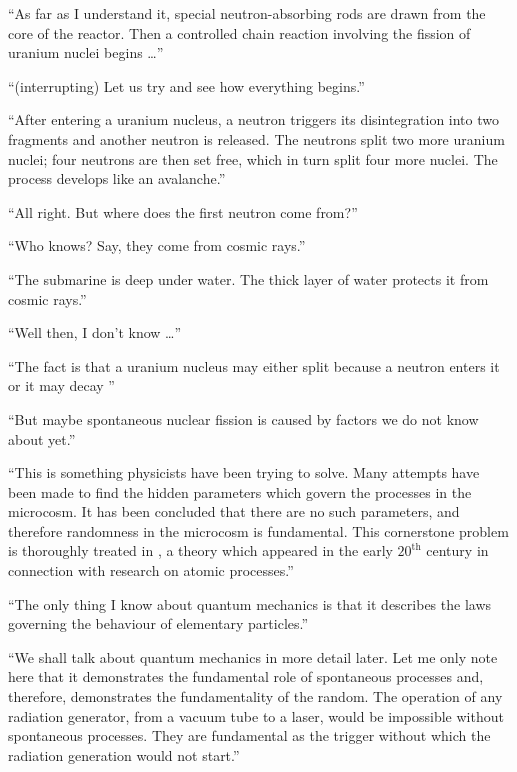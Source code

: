 \begin{dialogue}
\rdr  ``As far as I understand it, special
  neutron-absorbing rods are drawn from the core of the reactor. Then
  a controlled chain reaction involving the fission of uranium nuclei
  begins \ldots{}'' 

\athr ``(interrupting)  Let us try and see how everything begins.''

\rdr  ``After entering a uranium nucleus, a neutron triggers its
disintegration into two fragments and another neutron is released. The
neutrons split two more uranium nuclei; four neutrons are then set
free, which in turn split four more nuclei. The process develops like an avalanche.''

\athr  ``All right. But where does the first neutron come from?''

\rdr  ``Who knows? Say, they come from cosmic rays.''

\athr  ``The submarine is deep under water. The thick
  layer of water protects it from cosmic rays.''

\rdr  ``Well then, I don't know \ldots{}''

\athr   ``The fact is that a uranium nucleus may either
  split because a neutron enters it or it may decay
  ''

\rdr ``But maybe spontaneous nuclear fission is caused
  by factors we do not know about yet.''

\athr  ``This is something physicists have been trying to
  solve. Many attempts have been made to find the  hidden
    parameters which govern the processes in the microcosm. It has
  been concluded that there are no such parameters, and therefore
  randomness in the microcosm is fundamental. This cornerstone problem
  is thoroughly treated in , a theory which
  appeared in the early $20^{\text{th}}$ century in connection with research
  on atomic processes.''

\rdr  ``The only thing I know about quantum mechanics is
  that it describes the laws governing the behaviour of elementary particles.''
  
\athr  ``We shall talk about quantum mechanics in more
  detail later. Let me only note here that it demonstrates the
  fundamental role of spontaneous processes and, therefore,
  demonstrates the fundamentality of the random. The operation of any
  radiation generator, from a vacuum tube to a laser, would be
  impossible without spontaneous processes. They are fundamental as
  the  trigger without which the radiation generation would not start.''


\end{dialogue}
